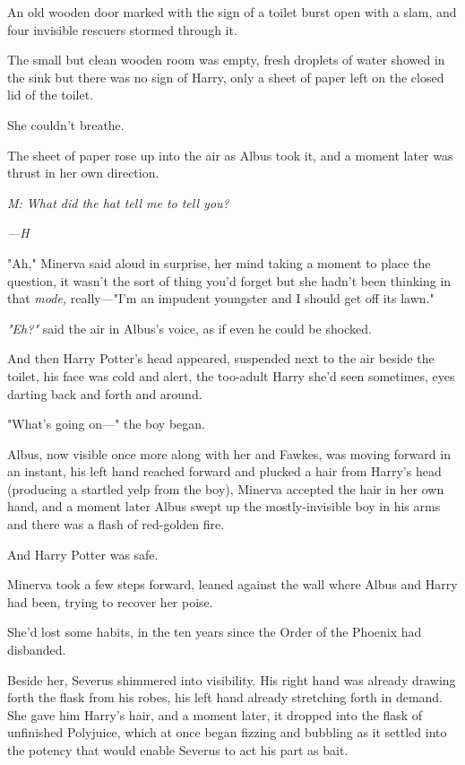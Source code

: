 An old wooden door marked with the sign of a toilet burst open with a slam, and
four invisible rescuers stormed through it.

The small but clean wooden room was empty, fresh droplets of water showed in
the sink but there was no sign of Harry, only a sheet of paper left on the
closed lid of the toilet.

She couldn't breathe.

The sheet of paper rose up into the air as Albus took it, and a moment later
was thrust in her own direction.

\emph{M: What did the hat tell me to tell you?}

\emph{---H}

"Ah," Minerva said aloud in surprise, her mind taking a moment to place the
question, it wasn't the sort of thing you'd forget but she hadn't been thinking
in that \emph{mode,} really\mbox{---}"I'm an impudent youngster and I should get off
its lawn."

\emph{"Eh?"} said the air in Albus's voice, as if even he could be shocked.

And then Harry Potter's head appeared, suspended next to the air beside the
toilet, his face was cold and alert, the too-adult Harry she'd seen sometimes,
eyes darting back and forth and around.

"What's going on\mbox{---}" the boy began.

Albus, now visible once more along with her and Fawkes, was moving forward in
an instant, his left hand reached forward and plucked a hair from Harry's head
(producing a startled yelp from the boy), Minerva accepted the hair in her own
hand, and a moment later Albus swept up the mostly-invisible boy in his arms
and there was a flash of red-golden fire.

And Harry Potter was safe.

Minerva took a few steps forward, leaned against the wall where Albus and Harry
had been, trying to recover her poise.

She'd{\el} lost some habits, in the ten years since the Order of the Phoenix
had disbanded.

Beside her, Severus shimmered into visibility. His right hand was already
drawing forth the flask from his robes, his left hand already stretching forth
in demand. She gave him Harry's hair, and a moment later, it dropped into the
flask of unfinished Polyjuice, which at once began fizzing and bubbling as it
settled into the potency that would enable Severus to act his part as bait.

